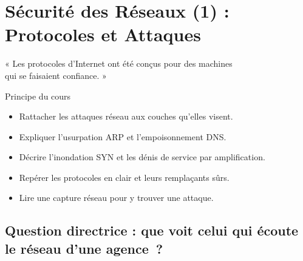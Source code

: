 
\chapter{Sécurité des Réseaux (1) : Protocoles et Attaques}
\label{chap:reseaux1}

\epigraph{%
    « Les protocoles d'Internet ont été conçus pour des machines\\
    qui se faisaient confiance. »%
}{Principe du cours}


\begin{boxobjectifs}
\begin{itemize}
    \item Rattacher les attaques réseau aux couches qu'elles visent.
    \item Expliquer l'usurpation ARP et l'empoisonnement DNS.
    \item Décrire l'inondation SYN et les dénis de service par
          amplification.
    \item Repérer les protocoles en clair et leurs remplaçants sûrs.
    \item Lire une capture réseau pour y trouver une attaque.
\end{itemize}
\end{boxobjectifs}

\bigskip

\section*{Question directrice : que voit celui qui écoute le réseau d'une agence~?}

